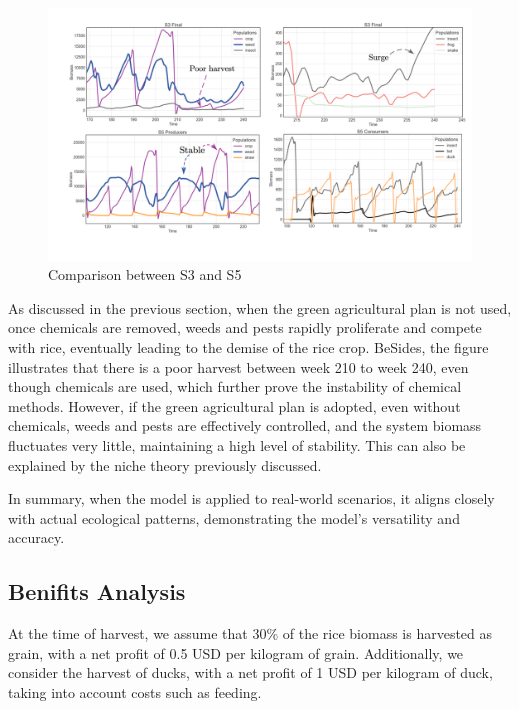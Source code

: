 \documentclass{HZNUMCM}
\begin{document}
          \begin{figure}
            \centering
            \includegraphics[width=\linewidth]{images/S3S5.png}
            \caption{Comparison between S3 and S5}
            \label{fig:S3S5}
          \end{figure}
          
          As discussed in the previous section, 
          when the green agricultural plan is not used, once chemicals are removed, 
          weeds and pests rapidly proliferate and compete with rice, eventually leading to the demise of the rice crop. 
          BeSides, the figure illustrates that there is a poor harvest between week 210 to week 240, even though chemicals are used, 
          which further prove the instability of chemical methods.
          However, if the green agricultural plan is adopted, even without chemicals, weeds and pests are effectively controlled, 
          and the system biomass fluctuates very little, maintaining a high level of stability. 
          This can also be explained by the niche theory previously discussed.
          
          In summary, when the model is applied to real-world scenarios, it aligns closely with actual ecological patterns, 
          demonstrating the model's versatility and accuracy.
      \subsection{Benifits Analysis}
        At the time of harvest, we assume that 30\% of the rice biomass is harvested as grain, 
        with a net profit of 0.5 USD per kilogram of grain. Additionally, we consider the harvest of ducks, 
        with a net profit of 1 USD per kilogram of duck, taking into account costs such as feeding. 
        
\end{document}
